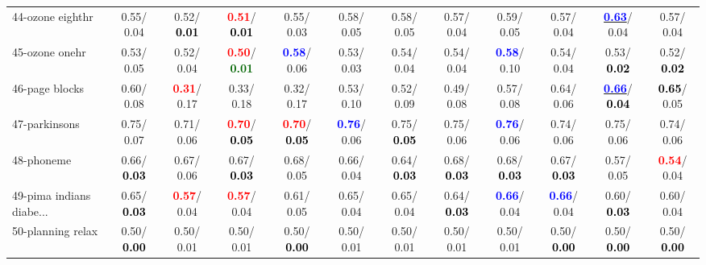 \begin{table}[h]
\begin{center}
{\begin{tabular}{lc|c|c|c|c|c|c|c|c|c|c}
44-ozone eighthr &   0.55/  0.04 &   0.52/\textcolor{black}{\textbf{  0.01}} & \textcolor{red}{\textbf{  0.51}}/\textcolor{black}{\textbf{  0.01}} &   0.55/  0.03 &   0.58/  0.05 &   0.58/  0.05 &   0.57/  0.04 &   0.59/  0.05 &   0.57/  0.04 & \underline{\textcolor{blue}{\textbf{  0.63}}}/  0.04 &   0.57/  0.04 \\
45-ozone onehr &   0.53/  0.05 &   0.52/  0.04 & \textcolor{red}{\textbf{  0.50}}/\textcolor{darkgreen}{\textbf{  0.01}} & \textcolor{blue}{\textbf{  0.58}}/  0.06 &   0.53/  0.03 &   0.54/  0.04 &   0.54/  0.04 & \textcolor{blue}{\textbf{  0.58}}/  0.10 &   0.54/  0.04 &   0.53/\textcolor{black}{\textbf{  0.02}} &   0.52/\textcolor{black}{\textbf{  0.02}} \\
46-page blocks &   0.60/  0.08 & \textcolor{red}{\textbf{  0.31}}/  0.17 &   0.33/  0.18 &   0.32/  0.17 &   0.53/  0.10 &   0.52/  0.09 &   0.49/  0.08 &   0.57/  0.08 &   0.64/  0.06 & \underline{\textcolor{blue}{\textbf{  0.66}}}/\textcolor{black}{\textbf{  0.04}} & \textcolor{black}{\textbf{  0.65}}/  0.05 \\ \hline
47-parkinsons &   0.75/  0.07 &   0.71/  0.06 & \textcolor{red}{\textbf{  0.70}}/\textcolor{black}{\textbf{  0.05}} & \textcolor{red}{\textbf{  0.70}}/\textcolor{black}{\textbf{  0.05}} & \textcolor{blue}{\textbf{  0.76}}/  0.06 &   0.75/\textcolor{black}{\textbf{  0.05}} &   0.75/  0.06 & \textcolor{blue}{\textbf{  0.76}}/  0.06 &   0.74/  0.06 &   0.75/  0.06 &   0.74/  0.06 \\
48-phoneme &   0.66/\textcolor{black}{\textbf{  0.03}} &   0.67/  0.06 &   0.67/\textcolor{black}{\textbf{  0.03}} &   0.68/  0.05 &   0.66/  0.04 &   0.64/\textcolor{black}{\textbf{  0.03}} &   0.68/\textcolor{black}{\textbf{  0.03}} &   0.68/\textcolor{black}{\textbf{  0.03}} &   0.67/\textcolor{black}{\textbf{  0.03}} &   0.57/  0.05 & \textcolor{red}{\textbf{  0.54}}/  0.04 \\
49-pima indians diabe... &   0.65/\textcolor{black}{\textbf{  0.03}} & \textcolor{red}{\textbf{  0.57}}/  0.04 & \textcolor{red}{\textbf{  0.57}}/  0.04 &   0.61/  0.05 &   0.65/  0.04 &   0.65/  0.04 &   0.64/\textcolor{black}{\textbf{  0.03}} & \textcolor{blue}{\textbf{  0.66}}/  0.04 & \textcolor{blue}{\textbf{  0.66}}/  0.04 &   0.60/\textcolor{black}{\textbf{  0.03}} &   0.60/  0.04 \\
50-planning relax &   0.50/\textcolor{black}{\textbf{  0.00}} &   0.50/  0.01 &   0.50/  0.01 &   0.50/\textcolor{black}{\textbf{  0.00}} &   0.50/  0.01 &   0.50/  0.01 &   0.50/  0.01 &   0.50/  0.01 &   0.50/\textcolor{black}{\textbf{  0.00}} &   0.50/\textcolor{black}{\textbf{  0.00}} &   0.50/\textcolor{black}{\textbf{  0.00}} \\

\end{tabular}}
\end{center}
\end{table}
